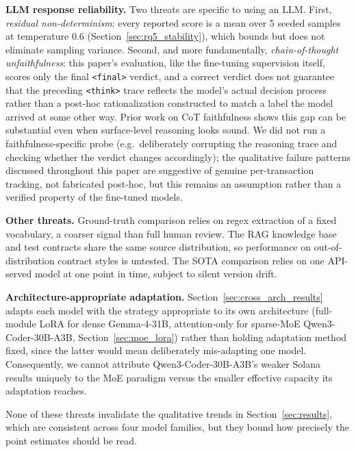 \documentclass[lettersize,journal]{IEEEtran}
\begin{document}
\textbf{LLM response reliability.} Two threats are specific to using an LLM. 
First, \emph{residual non-determinism}: every
reported score is a mean over 5 seeded samples at temperature 0.6 (Section~\ref{sec:rq5_stability}),
which bounds but does not eliminate sampling variance. Second, and more
fundamentally, \emph{chain-of-thought unfaithfulness}: this paper's evaluation, like the fine-tuning
supervision itself, scores only the final \texttt{<final>} verdict, and a correct verdict does not
guarantee that the preceding \texttt{<think>} trace reflects the model's actual decision process
rather than a post-hoc rationalization constructed to match a label the model arrived at some other
way. Prior work on CoT faithfulness \cite{turpin2023faithfulness} shows this gap can be substantial
even when surface-level reasoning looks sound. We did not run a faithfulness-specific probe (e.g.\
deliberately corrupting the reasoning trace and checking whether the verdict changes accordingly);
the qualitative failure patterns discussed throughout this paper are suggestive of genuine
per-transaction tracking, not fabricated post-hoc, but this remains an assumption rather than a
verified property of the fine-tuned models.

\textbf{Other threats.} Ground-truth comparison relies on regex extraction of a fixed vocabulary, a
coarser signal than full human review. The RAG knowledge base and test contracts share the same
source distribution, so performance on out-of-distribution contract styles is untested. The SOTA
comparison relies on one API-served model at one point in time, subject to silent version drift.

\textbf{Architecture-appropriate adaptation.} Section~\ref{sec:cross_arch_results} adapts each model
with the strategy appropriate to its own architecture (full-module LoRA for dense Gemma-4-31B,
attention-only for sparse-MoE Qwen3-Coder-30B-A3B, Section~\ref{sec:moe_lora}) rather than holding
adaptation method fixed, since the latter would mean deliberately mis-adapting one model.
Consequently, we cannot attribute Qwen3-Coder-30B-A3B's weaker Solana results uniquely to the MoE
paradigm versus the smaller effective capacity its adaptation reaches.

None of these threats invalidate the qualitative trends in Section~\ref{sec:results}, which are
consistent across four model families, but they bound how precisely the point estimates should be
read.
\end{document}
